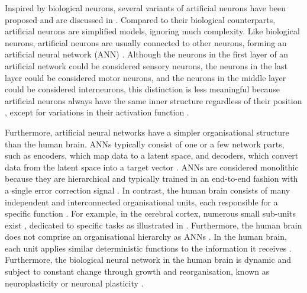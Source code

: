 Inspired by biological neurons, several variants of artificial neurons  have been proposed and are discussed in .
Compared to their biological counterparts, artificial neurons are simplified models, ignoring much complexity. Like biological neurons, artificial neurons are usually connected to other neurons, forming an artificial neural network (ANN) . Although the neurons in the first layer of an artificial network could be considered sensory neurons, the neurons in the last layer could be considered motor neurons, and the neurons in the middle layer could be considered interneurons, this distinction is less meaningful because artificial neurons always have the same inner structure regardless of their position , except for variations in their activation function \cite{fukushima_visual_1969}.

Furthermore, artificial neural networks have a simpler organisational structure than the human brain. ANNs typically consist of one or a few network parts, such as encoders, which map data to a latent space, and decoders, which convert data from the latent space into a target vector \cite{goodfellow_deep_2016}. ANNs are considered monolithic because they are hierarchical and typically trained in an end-to-end fashion with a single error correction signal . In contrast, the human brain consists of many independent and interconnected organisational units, each responsible for a specific function . For example, in the cerebral cortex, numerous small sub-units exist \cite{felleman_distributed_1991}, dedicated to specific tasks as illustrated in .
Furthermore, the human brain does not comprise an organisational hierarchy as ANNs . In the human brain, each unit applies similar deterministic functions to the information it receives \cite{mountcastle_organizing_1978, mountcastle_columnar_1997}. Furthermore, the biological neural network in the human brain is dynamic and subject to constant change through growth and reorganisation, known as neuroplasticity or neuronal plasticity .

